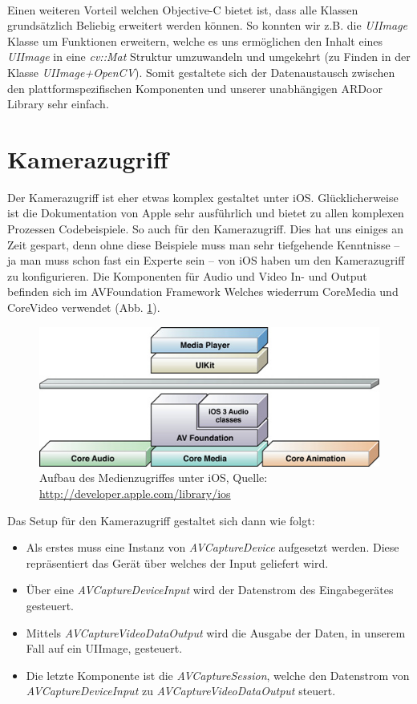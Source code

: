 \paragraph{}
Einen weiteren Vorteil welchen Objective-C bietet ist, dass alle Klassen grundsätzlich Beliebig erweitert werden können. So konnten wir z.B. die \textit{UIImage} Klasse um Funktionen erweitern, welche es uns ermöglichen den Inhalt eines \textit{UIImage} in eine \textit{cv::Mat} Struktur umzuwandeln und umgekehrt (zu Finden in der Klasse \textit{UIImage+OpenCV}). Somit gestaltete sich der Datenaustausch zwischen den plattformspezifischen Komponenten und unserer unabhängigen ARDoor Library sehr einfach.

\section{Kamerazugriff} Der Kamerazugriff ist eher etwas komplex gestaltet unter iOS. Glücklicherweise ist die Dokumentation von Apple sehr ausführlich und bietet zu allen komplexen Prozessen Codebeispiele. So auch für den Kamerazugriff. Dies hat uns einiges an Zeit gespart, denn ohne diese Beispiele muss man sehr tiefgehende Kenntnisse – ja man muss schon fast ein Experte sein – von iOS haben um den Kamerazugriff zu konfigurieren. Die Komponenten für Audio und Video In- und Output befinden sich im AVFoundation Framework Welches wiederrum CoreMedia und CoreVideo verwendet (Abb. \ref{fig:avfoundation}).

\begin{figure}[!ht]
\centering
\includegraphics[scale=0.6]{images/avfoundation.jpg} 
\caption{Aufbau des Medienzugriffes unter iOS, Quelle: \protect\url{http://developer.apple.com/library/ios}}
\label{fig:avfoundation}
\end{figure}

Das Setup für den Kamerazugriff gestaltet sich dann wie folgt:

\begin{itemize}
\item Als erstes muss eine Instanz von \textit{AVCaptureDevice} aufgesetzt werden. Diese repräsentiert das Gerät über welches der Input geliefert wird.
\item Über eine \textit{AVCaptureDeviceInput} wird der Datenstrom des Eingabegerätes gesteuert.
\item Mittels \textit{AVCaptureVideoDataOutput} wird die Ausgabe der Daten, in unserem Fall auf ein UIImage, gesteuert.
\item Die letzte Komponente ist die \textit{AVCaptureSession}, welche den Datenstrom von \textit{AVCaptureDeviceInput} zu \textit{AVCaptureVideoDataOutput} steuert.
\end{itemize}


